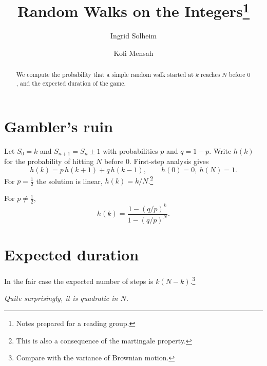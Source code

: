 \documentclass[11pt,letterpaper]{article}
\begin{document}
\title{Random Walks on the Integers\thanks{Notes prepared for a reading group.}}
\author{Ingrid Solheim \and Kofi Mensah}
\date{}
\maketitle
\begin{abstract}
We compute the probability that a simple random walk started at $k$ reaches $N$ before $0$, and the expected duration of the game.
\end{abstract}

\section{Gambler's ruin}
Let $S_0=k$ and $S_{n+1}=S_n\pm1$ with probabilities $p$ and $q=1-p$. Write $h(k)$ for the probability of hitting $N$ before $0$. First-step analysis gives
\begin{equation}
h(k)=p\,h(k+1)+q\,h(k-1),\qquad h(0)=0,\ h(N)=1.
\end{equation}
For $p=\tfrac12$ the solution is linear, $h(k)=k/N$.\footnote{This is also a consequence of the martingale property.}

For $p\ne\tfrac12$,
\[
h(k)=\frac{1-(q/p)^k}{1-(q/p)^N}.
\]

\section{Expected duration}
\begin{flushleft}
In the fair case the expected number of steps is $k(N-k)$.\footnote{Compare with the variance of Brownian motion.}
\end{flushleft}
\begin{flushright}
\emph{Quite surprisingly, it is quadratic in $N$.}
\end{flushright}
\end{document}
